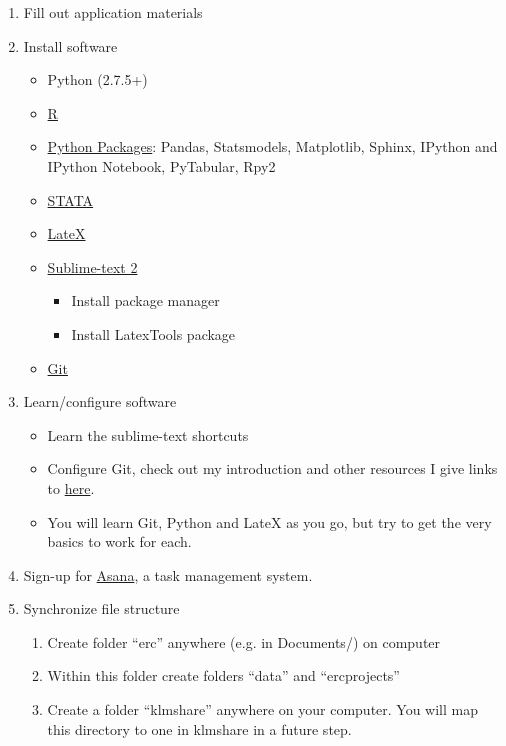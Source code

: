 \documentclass{article}
\begin{document}
	\begin{enumerate}
		\item Fill out application materials
		\item Install software
		\begin{itemize}
			\item Python (2.7.5+)
			\item \href{http://cran.cnr.berkeley.edu/}{R}
			\item \hyperref[sec:pypackage]{Python Packages}: Pandas, Statsmodels, Matplotlib, Sphinx, 
			IPython and IPython Notebook, PyTabular, Rpy2
			\item \hyperref[sec:stata]{STATA}
			\item \href{http://latex-project.org/ftp.html}{LateX}
			\item \href{http://www.sublimetext.com/2}{Sublime-text 2}
			\begin{itemize}
				\item Install package manager
				\item Install LatexTools package
			\end{itemize}
			\item \href{http://git-scm.com/book/en/Getting-Started-Installing-Git}{Git}
		\end{itemize}
		\item Learn/configure software
		\begin{itemize}
			\item Learn the sublime-text shortcuts
			\item Configure Git, check out my introduction
			and other resources I give links to \href{http://jaketorcasso.com/presentations/main.pdf}{here}.
			\item You will learn Git, Python and LateX as you go, but try
			to get the very basics to work for each.
		\end{itemize}
		\item Sign-up for \href{http://asana.com/}{Asana}, a task management
		system.
		\item Synchronize file structure
		\begin{enumerate}
			\item Create folder ``erc'' anywhere (e.g. in Documents/) on computer
			\item Within this folder create folders ``data'' and ``ercprojects''
			\item Create a folder ``klmshare'' anywhere on your computer. You
			will map this directory to one in klmshare in a future step.
		\end{enumerate}

\end{enumerate}
\end{document}
